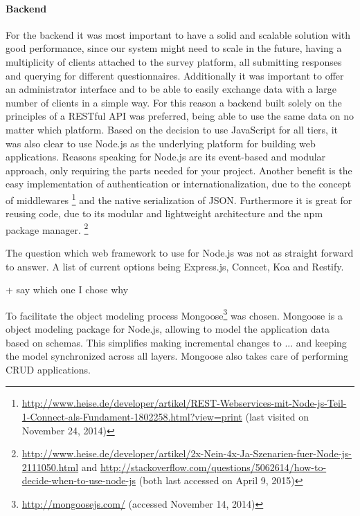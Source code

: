 	

	\paragraph{Backend}

		For the backend it was most important to have a solid and scalable solution with good performance, since our system might need to scale in the future, having a multiplicity of clients attached to the survey platform, all submitting responses and querying for different questionnaires. Additionally it was important to offer an administrator interface and to be able to easily exchange data with a large number of clients in a simple way. For this reason a backend built solely on the principles of a RESTful API was preferred, being able to use the same data on no matter which platform.
		Based on the decision to use JavaScript for all tiers, it was also clear to use Node.js as the underlying platform for building web applications. Reasons speaking for Node.js are its event-based and modular approach, only requiring the parts needed for your project. Another benefit is the easy implementation of authentication or internationalization, due to the concept of middlewares \footnote{\url{http://www.heise.de/developer/artikel/REST-Webservices-mit-Node-js-Teil-1-Connect-als-Fundament-1802258.html?view=print} (last visited on November 24, 2014)} and the native serialization of JSON. Furthermore it is great for reusing code, due to its modular and lightweight architecture and the npm package manager. \footnote{\url{http://www.heise.de/developer/artikel/2x-Nein-4x-Ja-Szenarien-fuer-Node-js-2111050.html} and \url{http://stackoverflow.com/questions/5062614/how-to-decide-when-to-use-node-js} (both last accessed on April 9, 2015)}


		The question which web framework to use for Node.js was not as straight forward to answer. A list of current options being Express.js, Conncet, Koa and Restify. 

				+ say which one I chose why


		To facilitate the object modeling process Mongoose\footnote{\url{http://mongoosejs.com/} (accessed November 14, 2014)} was chosen. Mongoose is a object modeling package for Node.js, allowing to model the application data based on schemas. This simplifies making incremental changes to ... and keeping the model synchronized across all layers. 	Mongoose also takes care of performing CRUD applications.

